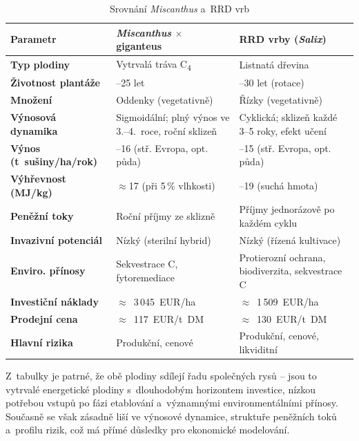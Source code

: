 \begin{table}[H]
    \centering
    \small
    \renewcommand{\arraystretch}{1.5}
    \caption{Srovnání \textit{Miscanthus} a~RRD vrb}
    \label{tab:srovnani_biomasy}
    \begin{tabularx}{\textwidth}{|>{\raggedright\arraybackslash}m{3.2cm}|>{\centering\arraybackslash}X|>{\centering\arraybackslash}X|}
        \hline
        \centering\textbf{Parametr} & \textbf{\textit{Miscanthus} $\times$ giganteus} & \textbf{RRD vrby (\textit{Salix})} \\
        \hline
        \textbf{Typ plodiny} & Vytrvalá tráva C\textsubscript{4} & Listnatá dřevina \\
        \hline
        \textbf{Životnost plantáže} & 20--25 let & 20--30 let (rotace) \\
        \hline
        \textbf{Množení} & Oddenky (vegetativně) & Řízky (vegetativně) \\
        \hline
        \textbf{Výnosová dynamika} & Sigmoidální; plný výnos ve 3.--4.~roce, roční sklizeň & Cyklická; sklizeň každé 3--5 roky, efekt učení \\
        \hline
        \textbf{Výnos (t~sušiny/ha/rok)} & 14--16 (stř. Evropa, opt. půda) & 12--15 (stř. Evropa, opt. půda) \\
        \hline
        \textbf{Výhřevnost (MJ/kg)} & $\approx$17 (při 5\,\% vlhkosti) & 16--19 (suchá hmota) \\
        \hline
        \textbf{Peněžní toky} & Roční příjmy ze sklizně & Příjmy jednorázově po každém cyklu \\
        \hline
        \textbf{Invazivní potenciál} & Nízký (sterilní hybrid) & Nízký (řízená kultivace) \\
        \hline
        \textbf{Enviro. přínosy} & Sekvestrace C, fytoremediace & Protierozní ochrana, biodiverzita, sekvestrace C \\
        \hline
        \textbf{Investiční náklady}     & $\approx$~3\,045~EUR/ha           & $\approx$~1\,509~EUR/ha          \\
        \hline
\textbf{Prodejní cena}    & $\approx$~117~EUR/t~DM  & $\approx$~130~EUR/t~DM  \\
\hline
        \textbf{Hlavní rizika} & Produkční, cenové & Produkční, cenové, likviditní \\
        \hline
    \end{tabularx}
\end{table}


Z~tabulky je patrné, že obě plodiny sdílejí řadu společných rysů -- jsou to vytrvalé energetické plodiny s~dlouhodobým horizontem investice, nízkou potřebou vstupů po fázi etablování a~významnými environmentálními přínosy. Současně se však zásadně liší ve výnosové dynamice, struktuře peněžních toků a~profilu rizik, což má přímé důsledky pro ekonomické modelování.

